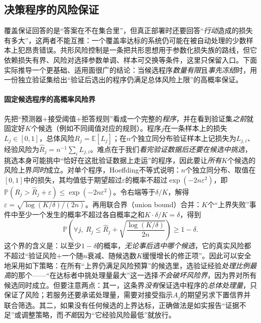 \subsection{决策程序的风险保证}

覆盖保证回答的是“答案在不在集合里”，但真正部署时还要回答“\emph{行动}造成的损失有多大”，这两者不能互推：一个覆盖率达标的系统仍可能在被自动处理的少数样本上犯昂贵错误。共形风险控制是一条把共形思想用于参数化损失族的路线，但它依赖损失有界、风险对选择参数单调、样本可交换等条件，这里只保留入口。下面实际推导一个更基础、适用面很广的结论：当候选程序\emph{数量有限}且\emph{事先冻结}时，用一份独立验证集给出“验证后选出的程序仍满足总体风险上限”的高概率保证。

\paragraph{固定候选程序的高概率风险界}

先把“预测器+接受阈值+拒答规则”看成一个完整的\emph{程序}，并在看到验证集\emph{之前}就固定好$K$个候选（例如不同阈值对应的规则）。程序$j$在一条样本上的损失$L_j\in[0,1]$，总体风险$R_j=\mathbb E[L_j]$；在$n$个独立同分布验证样本上记损失为$L_{j,i}$、经验风险为$\hat R_j=n^{-1}\sum_i L_{j,i}$。难点在于我们\emph{看完验证数据后还要在候选中挑选}，挑选本身可能挑中“恰好在这批验证数据上走运”的程序，因此要让\emph{所有}$K$个候选的风险上界\emph{同时}成立。对单个程序，Hoeffding不等式说明：$n$个独立同分布、取值在$[0,1]$中的损失，其均值低于期望超过$\varepsilon$的概率不超过$\exp(-2n\varepsilon^2)$，即$\mathbb P(R_j>\hat R_j+\varepsilon)\leq\exp(-2n\varepsilon^2)$。令右端等于$\delta/K$，解得$\varepsilon=\sqrt{\log(K/\delta)/(2n)}$。再用联合界（union bound）合并：$K$个“上界失败”事件中至少一个发生的概率不超过各自概率之和$K\cdot\delta/K=\delta$，得到
\begin{equation}
 \mathbb P\left(
  \forall j,\ R_j\leq
  \hat R_j+\sqrt{\frac{\log(K/\delta)}{2n}}
 \right)\geq1-\delta.
 \label{eq:reliability-finite-program-bound}
\end{equation}
这个界的含义是：以至少$1-\delta$的概率，\emph{无论事后选中哪个候选}，它的真实风险都不超过“验证风险+一个随$n$衰减、随候选数$K$缓慢增长的修正项”。因此可以安全地采用如下策略：在所有“上界仍满足风险预算”的候选里，选验证经验\emph{处理比例最高}的那个——“在达标者中挑处理量最大”这一选择\emph{不会破坏风险界}，因为界对所有候选同时成立。但要注意两点：其一，这条界\emph{没有}保证选中程序的\emph{总体处理量}，只保证了风险；若服务还要承诺处理量，需要对接受指示$A_j$的期望另求下置信界并联合筛选。其二，如果没有任何候选的上界达标，正确做法是如实报告“证据不足”或调整策略，而\emph{不能}因为“它经验风险最低”就放行。

